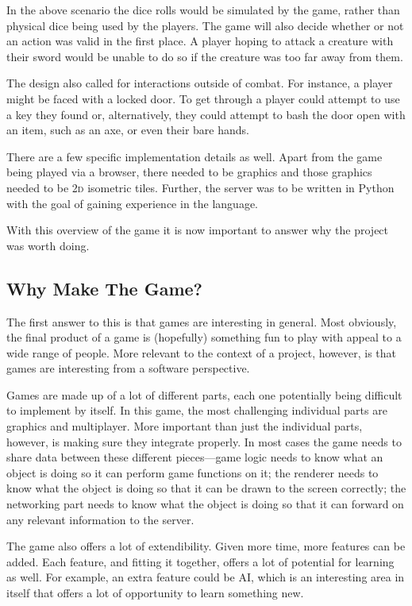 In the above scenario the dice rolls would be simulated by the game, rather than physical dice being used by the players. The game will also decide whether or not an action was valid in the first place. A player hoping to attack a creature with their sword would be unable to do so if the creature was too far away from them.

The design also called for interactions outside of combat. For instance, a player might be faced with a locked door. To get through a player could attempt to use a key they found or, alternatively, they could attempt to bash the door open with an item, such as an axe, or even their bare hands.

There are a few specific implementation details as well. Apart from the game being played via a browser, there needed to be graphics and those graphics needed to be \textsc{2d} isometric tiles. Further, the server was to be written in Python with the goal of gaining experience in the language.

With this overview of the game it is now important to answer why the project was worth doing.

\subsection{Why Make The Game?}
The first answer to this is that games are interesting in general. Most obviously, the final product of a game is (hopefully) something fun to play with appeal to a wide range of people. More relevant to the context of a project, however, is that games are interesting from a software perspective.

Games are made up of a lot of different parts, each one potentially being difficult to implement by itself. In this game, the most challenging individual parts are graphics and multiplayer. More important than just the individual parts, however, is making sure they integrate properly. In most cases the game needs to share data between these different pieces---game logic needs to know what an object is doing so it can perform game functions on it; the renderer needs to know what the object is doing so that it can be drawn to the screen correctly; the networking part needs to know what the object is doing so that it can forward on any relevant information to the server.

The game also offers a lot of extendibility. Given more time, more features can be added. Each feature, and fitting it together, offers a lot of potential for learning as well. For example, an extra feature could be AI, which is an interesting area in itself that offers a lot of opportunity to learn something new.

